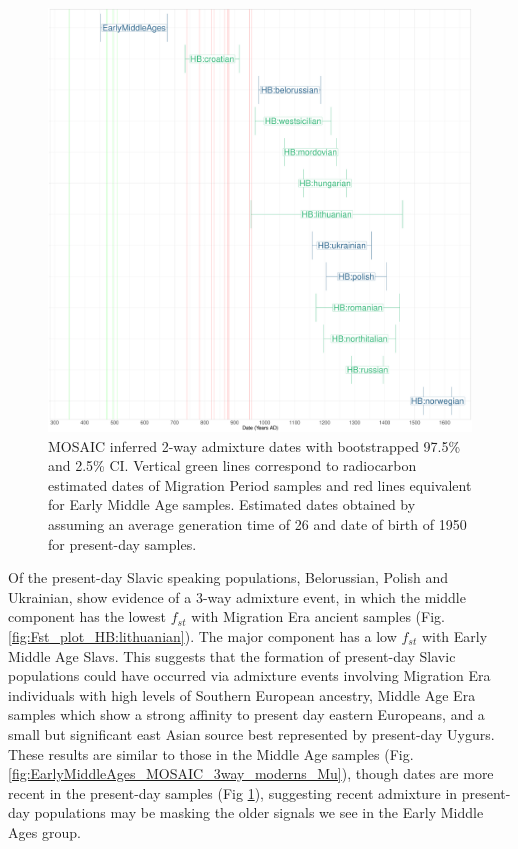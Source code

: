 \begin{figure}[htp]
    \centering
    \includegraphics[width=1.0\textwidth]{../images/chapter5/MOSAIC_admixture_dates_plot.pdf}
    \caption{MOSAIC inferred 2-way admixture dates with bootstrapped 97.5\% and 2.5\% CI. Vertical green lines correspond to radiocarbon estimated dates of Migration Period samples and red lines equivalent for Early Middle Age samples. Estimated dates obtained by assuming an average generation time of 26 and date of birth of 1950 for present-day samples.}
    \label{fig:MOSAIC_admixture_dates_plot}
\end{figure} 

Of the present-day Slavic speaking populations, Belorussian, Polish and Ukrainian, show evidence of a 3-way admixture event, in which the middle component has the lowest $f_{st}$ with Migration Era ancient samples (Fig. \ref{fig:Fst_plot_HB:lithuanian}). The major component has a low $f_{st}$ with Early Middle Age Slavs. This suggests that the formation of present-day Slavic populations could have occurred via admixture events involving Migration Era individuals with high levels of Southern European ancestry, Middle Age Era samples which show a strong affinity to present day eastern Europeans, and a small but significant east Asian source best represented by present-day Uygurs. These results are similar to those in the Middle Age samples (Fig. \ref{fig:EarlyMiddleAges_MOSAIC_3way_moderns_Mu}), though dates are more recent in the present-day samples (Fig \ref{fig:MOSAIC_admixture_dates_plot}), suggesting recent admixture in present-day populations may be masking the older signals we see in the Early Middle Ages group.

